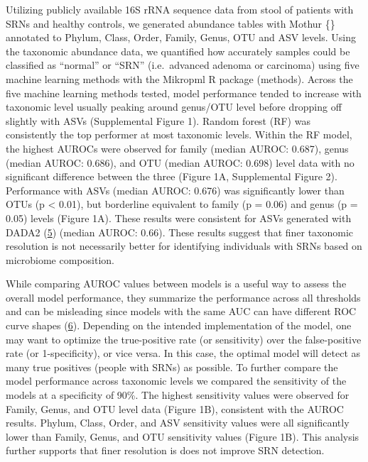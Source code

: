 \documentclass[
]{article}
\begin{document}
Utilizing publicly available 16S rRNA sequence data from stool of
patients with SRNs and healthy controls, we generated abundance tables
with Mothur \{\} annotated to Phylum, Class, Order, Family, Genus, OTU
and ASV levels. Using the taxonomic abundance data, we quantified how
accurately samples could be classified as ``normal'' or ``SRN''
(i.e.~advanced adenoma or carcinoma) using five machine learning methods
with the Mikropml R package (methods). Across the five machine learning
methods tested, model performance tended to increase with taxonomic
level usually peaking around genus/OTU level before dropping off
slightly with ASVs (Supplemental Figure 1). Random forest (RF) was
consistently the top performer at most taxonomic levels. Within the RF
model, the highest AUROCs were observed for family (median AUROC:
0.687), genus (median AUROC: 0.686), and OTU (median AUROC: 0.698) level
data with no significant difference between the three (Figure 1A,
Supplemental Figure 2). Performance with ASVs (median AUROC: 0.676) was
significantly lower than OTUs (p \textless{} 0.01), but borderline
equivalent to family (p = 0.06) and genus (p = 0.05) levels (Figure 1A).
These results were consistent for ASVs generated with DADA2
(\protect\hyperlink{ref-callahan2016}{5}) (median AUROC: 0.66). These
results suggest that finer taxonomic resolution is not necessarily
better for identifying individuals with SRNs based on microbiome
composition.

While comparing AUROC values between models is a useful way to assess
the overall model performance, they summarize the performance across all
thresholds and can be misleading since models with the same AUC can have
different ROC curve shapes (\protect\hyperlink{ref-lobo2008}{6}).
Depending on the intended implementation of the model, one may want to
optimize the true-positive rate (or sensitivity) over the false-positive
rate (or 1-specificity), or vice versa. In this case, the optimal model
will detect as many true positives (people with SRNs) as possible. To
further compare the model performance across taxonomic levels we
compared the sensitivity of the models at a specificity of 90\%. The
highest sensitivity values were observed for Family, Genus, and OTU
level data (Figure 1B), consistent with the AUROC results. Phylum,
Class, Order, and ASV sensitivity values were all significantly lower
than Family, Genus, and OTU sensitivity values (Figure 1B). This
analysis further supports that finer resolution is does not improve SRN
detection.
\end{document}
